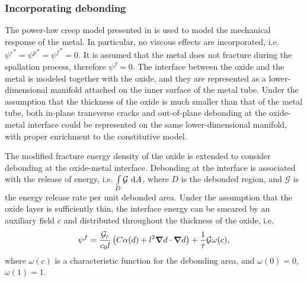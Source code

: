 \subsubsection{Incorporating debonding}

The power-law creep model presented in  is used to model the mechanical response of the metal. In particular, no viscous effects are incorporated, i.e. ${\psi^e}^* = {\psi^p}^* = {\psi^f}^* = 0$. It is assumed that the metal does not fracture during the spallation process, therefore $\psi^f = 0$. The interface between the oxide and the metal is modeled together with the oxide, and they are represented as a lower-dimensional manifold attached on the inner surface of the metal tube. Under the assumption that the thickness of the oxide is much smaller than that of the metal tube, both in-plane transverse cracks and out-of-plane debonding at the oxide-metal interface could be represented on the same lower-dimensional manifold, with proper enrichment to the constitutive model.

The modified fracture energy density of the oxide is extended to consider debonding at the oxide-metal interface. Debonding at the interface is associated with the release of energy, i.e. $\int\limits_D \mathcal{G} \text{ d}A$, where $D$ is the debonded region, and $\mathcal{G}$ is the energy release rate per unit debonded area. Under the assumption that the oxide layer is sufficiently thin, the interface energy can be smeared by an auxiliary field $c$ and distributed throughout the thickness of the oxide, i.e.
\begin{align}
  \psi^f = \dfrac{{\mathcal{G}_c}}{c_0 l} \left( C\alpha(d) + l^2 \boldsymbol{\nabla} d \cdot \boldsymbol{\nabla} d \right) + \dfrac{1}{\tau} \mathcal{G} \omega(c),
\end{align}
where $\omega(c)$ is a characteristic function for the debonding area, and $\omega(0) = 0$, $\omega(1) = 1$.

